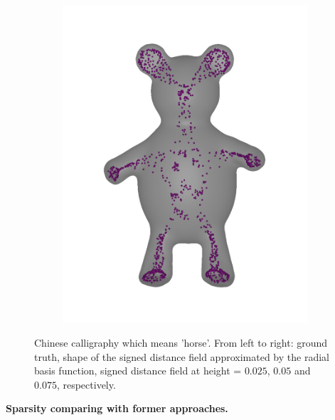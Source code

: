 \documentclass[review]{acmsiggraph}
\begin{document}
\begin{figure}
\begin{subfigure}[b]{0.19\linewidth}
                \includegraphics[width=\textwidth]{images/bear/4.pdf}
        \end{subfigure}
        \caption{Chinese calligraphy which means 'horse'. From left to right: ground truth, shape of the signed distance field approximated by the radial basis function, signed distance field at height = $0.025$, $0.05$ and $0.075$, respectively. }
				\label{fig:horse}
\end{figure}



\textbf{Sparsity comparing with former approaches. }
\end{document}

